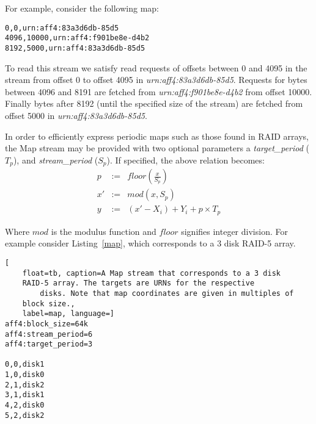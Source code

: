 \documentclass[10pt, conference]{IEEEtran}
\begin{document}
{{For example, consider the following map:
\begin{lstlisting}
0,0,urn:aff4:83a3d6db-85d5
4096,10000,urn:aff4:f901be8e-d4b2
8192,5000,urn:aff4:83a3d6db-85d5
\end{lstlisting}

To read this stream we satisfy read requests of offsets between 0 and
4095 in the stream from offset 0 to offset 4095 in
\emph{urn:aff4:83a3d6db-85d5}. Requests for bytes between 4096 and 8191 are
fetched from \emph{urn:aff4:f901be8e-d4b2} from offset 10000. Finally
bytes after 8192 (until the specified size of the stream) are fetched
from offset 5000 in \emph{urn:aff4:83a3d6db-85d5}.

In order to efficiently express periodic maps such as those found in
RAID arrays, the Map stream may be provided with two optional
parameters a {\em target\_period} ($T_p$), and {\em stream\_period}
($S_p$). If specified, the above relation becomes:
\begin{eqnarray*}
p &:=& floor\left (\frac{x}{S_p} \right) \\
x' &:=& mod(x ,S_p)  \\   \label{eq:no1}
y &:=& (x'-X_i) + Y_i + p \times T_p
\end{eqnarray*}

Where $mod$ is the modulus function and $floor$ signifies integer
division. For example consider Listing~\ref{map}, which corresponds to a 3
disk RAID-5 array.

\begin{lstlisting}[
	float=tb, caption=A Map stream that corresponds to a 3 disk
	RAID-5 array. The targets are URNs for the respective
        disks. Note that map coordinates are given in multiples of 
	block size.,
	label=map, language=]
aff4:block_size=64k 
aff4:stream_period=6 
aff4:target_period=3

0,0,disk1
1,0,disk0
2,1,disk2
3,1,disk1
4,2,disk0
5,2,disk2
\end{lstlisting}



}}
\end{document}
